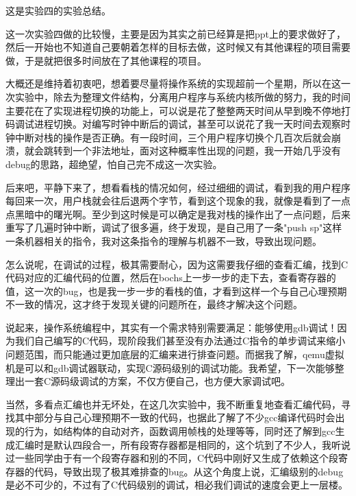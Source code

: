\documentclass[forprint]{WHUBachelor}
\begin{document}
这是实验四的实验总结。

这一次实验四做的比较慢，主要是因为其实之前已经算是把ppt上的要求做好了，然后一开始也不知道自己要朝着怎样的目标去做，这时候又有其他课程的项目需要做，于是就把很多时间放在了其他课程的项目。

大概还是维持着初衷吧，想着要尽量将操作系统的实现超前一个星期，所以在这一次实验中，除去为整理文件结构，分离用户程序与系统内核所做的努力，我的时间主要花在了实现进程切换的功能上，可以说是花了整整两天时间从早到晚不停地打码调试进程切换。对编写时钟中断后的调试，甚至可以说花了我一天时间去观察时钟中断对栈的操作是否正确。有一段时间，三个用户程序切换个几百次后就会崩溃，就会跳转到一个非法地址，面对这种概率性出现的问题，我一开始几乎没有debug的思路，超绝望，怕自己完不成这一次实验。

后来吧，平静下来了，想看看栈的情况如何，经过细细的调试，看到我的用户程序每回来一次，用户栈就会往后退两个字节，看到这个现象的我，就像是看到了一点点黑暗中的曙光啊。至少到这时候是可以确定是我对栈的操作出了一点问题，后来重写了几遍时钟中断，调试了很多遍，终于发现，是自己用了一条"push sp"这样一条机器相关的指令，我对这条指令的理解与机器不一致，导致出现问题。

怎么说呢，在调试的过程，极其需要耐心，因为这需要我仔细的查看汇编，找到C代码对应的汇编代码的位置，然后在bochs上一步一步的走下去，查看寄存器的值，这一次的bug，也是我一步一步的看栈的值，才看到这样一个与自己心理预期不一致的情况，这才终于发现关键的问题所在，最终才解决这个问题。

说起来，操作系统编程中，其实有一个需求特别需要满足：能够使用gdb调试！因为我们自己编写的C代码，现阶段我们甚至没有办法通过C指令的单步调试来缩小问题范围，而只能通过更加底层的汇编来进行排查问题。而据我了解，qemu虚拟机是可以和gdb调试器联动，实现C源码级别的调试功能。我希望，下一次能够整理出一套C源码级调试的方案，不仅方便自己，也方便大家调试吧。

当然，多看点汇编也并无坏处，在这几次实验中，我不断重复地查看汇编代码，寻找其中部分与自己心理预期不一致的代码，也据此了解了不少gcc编译代码时会出现的行为，如结构体的自动对齐，函数调用帧栈的处理等等，同时还了解到gcc生成汇编时是默认四段合一，所有段寄存器都是相同的，这个坑到了不少人，我听说过一些同学由于有一个段寄存器和别的不同，C代码中刚好又生成了依赖这个段寄存器的代码，导致出现了极其难排查的bug。从这个角度上说，汇编级别的debug是必不可少的，不过有了C代码级别的调试，相必我们调试的速度会更上一层楼。



\end{document}
